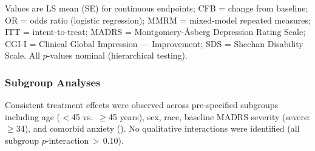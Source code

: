 {\small\vspace{1mm}Values are LS mean (SE) for continuous endpoints; CFB = change from baseline;
OR = odds ratio (logistic regression); MMRM = mixed-model repeated measures; ITT = intent-to-treat;
MADRS = Montgomery-\AA{}sberg Depression Rating Scale; CGI-I = Clinical Global Impression ---
Improvement; SDS = Sheehan Disability Scale. All $p$-values nominal (hierarchical testing).}

\vspace{3mm}
\subsubsection{Subgroup Analyses}

Consistent treatment effects were observed across pre-specified subgroups including age
($<$45 vs.\ $\geq$45 years), sex, race, baseline MADRS severity (severe: $\geq$34), and comorbid
anxiety (). No
qualitative interactions were identified (all subgroup $p$-interaction\,$>$\,0.10).

